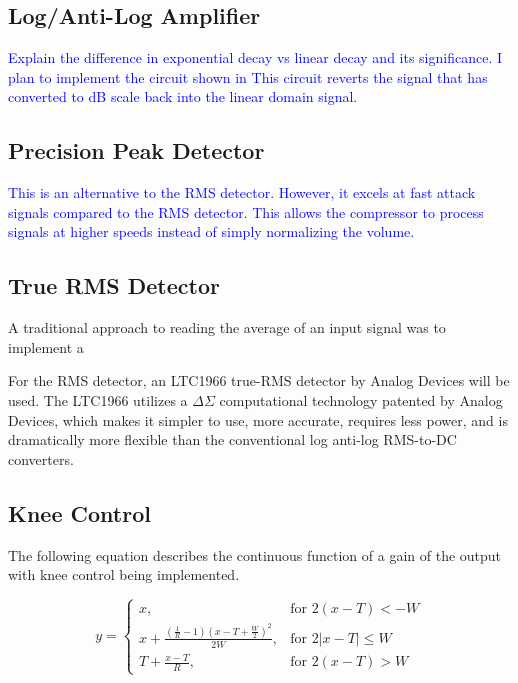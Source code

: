 \documentclass[10pt]{article}
\begin{document}
\begin{multicols}{2}
            \subsection{Log/Anti-Log Amplifier}
                \textcolor{blue}{Explain the difference in exponential decay vs linear decay and its significance. I plan to implement the circuit shown in \cite{ti-log-conv}}
                \textcolor{blue}{This circuit reverts the signal that has converted to dB scale back into the linear domain signal.}
            
            \subsection{Precision Peak Detector}
                \textcolor{blue}{This is an alternative to the RMS detector. However, it excels at fast attack signals compared to the RMS detector. This allows the compressor to process signals at higher speeds instead of simply normalizing the volume.}  

            \subsection{True RMS Detector}
                A traditional approach to reading the average of an input signal was to implement a 
                
                For the RMS detector, an LTC1966 true-RMS detector by Analog Devices will be used. The LTC1966 utilizes a $\Delta\Sigma$ computational technology patented by Analog Devices, which makes it simpler to use, more accurate, requires less power, and is dramatically more flexible than the conventional log anti-log RMS-to-DC converters.                          
            
            \subsection{Knee Control}
                The following equation describes the continuous function of a gain of the output with knee control being implemented.


                \begin{equation}
                    y=
                    \begin{cases}
                        x, & \text{for $2(x-T)<-W$}\\
                        x+\frac{(\frac{1}{R}-1)(x-T+\frac{W}{2})^2}{2W}, & \text{for $2\left\lvert x-T\right\rvert\leq W$}\\
                        T+\frac{x-T}{R}, & \text{for $2(x-T)>W$}
                    \end{cases}
                \end{equation}



\end{multicols}
\end{document}
